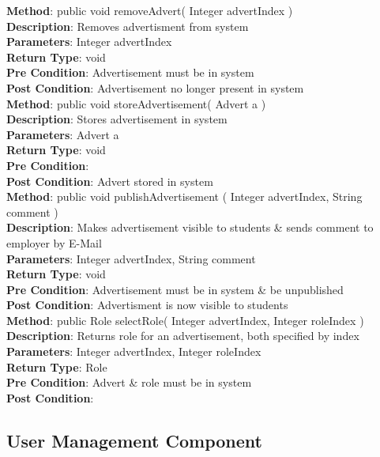 \documentclass{l3deliverable}
\begin{document}
\textbf{Method}: public void removeAdvert( Integer advertIndex )\\
\textbf{Description}: Removes advertisment from system\\
\textbf{Parameters}: Integer advertIndex \\
\textbf{Return Type}: void \\
\textbf{Pre Condition}: Advertisement must be in system \\
\textbf{Post Condition}: Advertisement no longer present in system\\

\textbf{Method}: public void storeAdvertisement( Advert a )\\
\textbf{Description}: Stores advertisement in system\\
\textbf{Parameters}: Advert a\\
\textbf{Return Type}: void\\
\textbf{Pre Condition}:\\
\textbf{Post Condition}: Advert stored in system\\

\textbf{Method}: public void publishAdvertisement ( Integer advertIndex, String comment )\\
\textbf{Description}: Makes advertisement visible to students \& sends comment to employer by E-Mail\\
\textbf{Parameters}: Integer advertIndex, String comment\\
\textbf{Return Type}: void\\
\textbf{Pre Condition}: Advertisement must be in system \& be unpublished\\
\textbf{Post Condition}: Advertisment is now visible to students\\

\textbf{Method}: public Role selectRole( Integer advertIndex, Integer roleIndex )\\
\textbf{Description}: Returns role for an advertisement, both specified by index\\
\textbf{Parameters}: Integer advertIndex, Integer roleIndex\\
\textbf{Return Type}: Role\\
\textbf{Pre Condition}: Advert \& role must be in system\\
\textbf{Post Condition}:\\


\subsection{User Management Component}
\end{document}

